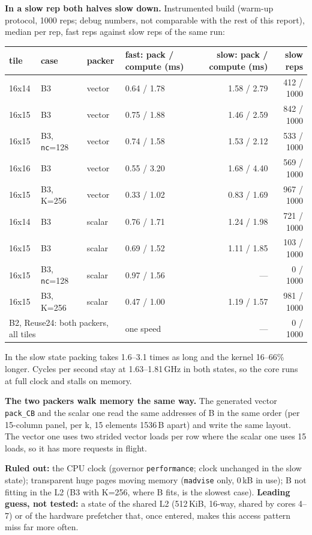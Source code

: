 \documentclass[10pt,a4paper]{article}
\begin{document}
\textbf{In a slow rep both halves slow down.} Instrumented build (warm-up protocol, 1000 reps; debug numbers,
not comparable with the rest of this report), median per rep, fast reps against slow reps of the same run:

\begin{center}\small
\begin{tabular}{llllrr}
\toprule
tile & case & packer & fast: pack / compute (ms) & slow: pack / compute (ms) & slow reps \\
\midrule
16x14 & B3 & vector & 0.64 / 1.78 & 1.58 / 2.79 & 412 / 1000 \\
16x15 & B3 & vector & 0.75 / 1.88 & 1.46 / 2.59 & 842 / 1000 \\
16x15 & B3, \texttt{nc}=128 & vector & 0.74 / 1.58 & 1.53 / 2.12 & 533 / 1000 \\
16x16 & B3 & vector & 0.55 / 3.20 & 1.68 / 4.40 & 569 / 1000 \\
16x15 & B3, K=256 & vector & 0.33 / 1.02 & 0.83 / 1.69 & 967 / 1000 \\
16x14 & B3 & scalar & 0.76 / 1.71 & 1.24 / 1.98 & 721 / 1000 \\
16x15 & B3 & scalar & 0.69 / 1.52 & 1.11 / 1.85 & 103 / 1000 \\
16x15 & B3, \texttt{nc}=128 & scalar & 0.97 / 1.56 & --- & 0 / 1000 \\
16x15 & B3, K=256 & scalar & 0.47 / 1.00 & 1.19 / 1.57 & 981 / 1000 \\
\multicolumn{3}{l}{B2, Reuse24: both packers, all tiles} & one speed & --- & 0 / 1000 \\
\bottomrule
\end{tabular}
\end{center}
In the slow state packing takes 1.6--3.1 times as long and the kernel 16--66\% longer. Cycles per second stay at
1.63--1.81\,GHz in both states, so the core runs at full clock and stalls on memory.

\textbf{The two packers walk memory the same way.} The generated vector \texttt{pack\_CB} and the scalar one
read the same addresses of B in the same order (per 15-column panel, per k, 15 elements 1536\,B apart) and write
the same layout. The vector one uses two strided vector loads per row where the scalar one uses 15 loads, so it
has more requests in flight.

\textbf{Ruled out:} the CPU clock (governor \texttt{performance}; clock unchanged in the slow state); transparent
huge pages moving memory (\texttt{madvise} only, 0\,kB in use); B not fitting in the L2 (B3 with K=256, where B
fits, is the slowest case). \textbf{Leading guess, not tested:} a state of the shared L2 (512\,KiB, 16-way, shared by
cores 4--7) or of the hardware prefetcher that, once entered, makes this access pattern miss far more often.
\end{document}
